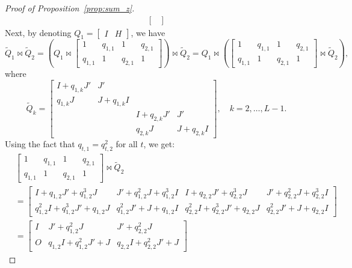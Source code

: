\documentclass[a4paper]{article}
\begin{document}
\begin{proof}[Proof of Proposition~\ref{prop:sum_z}]
\[\begin{split}
\begin{bmatrix}
    \end{bmatrix}
\end{split}
\]
Next, by denoting $Q_1 = \begin{bmatrix} I & H \end{bmatrix}$, we have
\[
    {\widetilde Q}_1 \Join {\widetilde Q}_2 = \left(Q_1 \Join  
    \begin{bmatrix}
        1 & q_{1,1} & 1 & q_{2,1} \\
        q_{1,1} & 1 & q_{2,1} & 1
    \end{bmatrix}  \right)
    \Join
    {\widetilde Q}_2
    =
    Q_1 \Join  
    \left(
    \begin{bmatrix}
        1 & q_{1,1} & 1 & q_{2,1} \\
        q_{1,1} & 1 & q_{2,1} & 1
    \end{bmatrix}
    \Join
    {\widetilde Q}_2
    \right),
\]
where
\begin{equation}\label{eq:proof:Q}
    {\widetilde Q}_k = 
    \begin{bmatrix}
        I + q_{1,k} J' & J' \\
        q_{1,k} J & J + q_{1,k} I \\
        & & I + q_{2,k} J' & J' \\
        & & q_{2,k} J & J + q_{2,k} I
    \end{bmatrix}, 
    \quad  
    k = 2,\dots,L-1.
\end{equation}
Using the fact that $q_{t,1} = q_{t,2}^2$ for all $t$, we get:
\[
\begin{split}
    &\begin{bmatrix}
        1 & q_{1,1} & 1 & q_{2,1} \\
        q_{1,1} & 1 & q_{2,1} & 1
    \end{bmatrix}
    \Join
    {\widetilde Q}_2
     \\
    &=\begin{bmatrix}
        I + q_{1,2} J' + q_{1,2}^3 J & J' + q_{1,2}^2J + q_{1,2}^3 I & I + q_{2,2} J' + q_{2,2}^3 J & J' + q_{2,2}^2J + q_{2,2}^3 I \\
        q_{1,2}^2 I + q_{1,2}^3 J' + q_{1,2} J & q_{1,2}^2J'+ J + q_{1,2} I & q_{2,2}^2 I + q_{2,2}^3 J' + q_{2,2} J & q_{2,2}^2J'+ J + q_{2,2} I
    \end{bmatrix} 
    \\
    &= 
    \begin{bmatrix}
        I & J' + q_{1,2}^2 J &  J' + q_{2,2}^2 J \\
        O & q_{1,2}I + q_{1,2}^2 J' + J & q_{2,2}I + q_{2,2}^2 J' + J

\end{bmatrix}
\end{split}\]
\end{proof}
\end{document}
